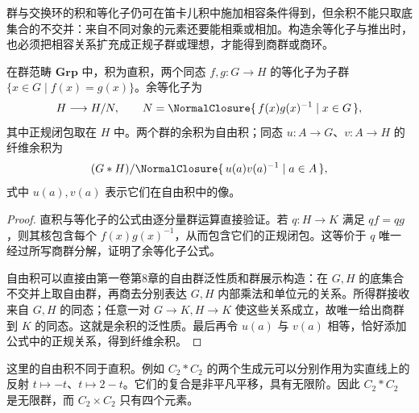群与交换环的积和等化子仍可在笛卡儿积中施加相容条件得到，但余积不能只取底集合的不交并：来自不同对象的元素还要能相乘或相加。构造余等化子与推出时，也必须把相容关系扩充成正规子群或理想，才能得到商群或商环。

\begin{proposition}[群中的基本构造]\label{b4:prop:group-limits-colimits}
	在群范畴 \(\mathbf{Grp}\) 中，积为直积，两个同态 \(f,g:G\rightarrow H\) 的等化子为子群 \(\{x\in G\mid f(x)=g(x)\}\)。余等化子为
	\[
		H\longrightarrow H/N,\qquad N=\NormalClosure{\,f(x)g(x)^{-1}\mid x\in G\,},
	\]
	其中正规闭包取在 \(H\) 中。两个群的余积为自由积；同态 \(u:A\rightarrow G\)、\(v:A\rightarrow H\) 的纤维余积为
	\[
		(G*H)/\NormalClosure{\,u(a)v(a)^{-1}\mid a\in A\,},
	\]
	式中 \(u(a),v(a)\) 表示它们在自由积中的像。
\end{proposition}
\begin{proof}
	直积与等化子的公式由逐分量群运算直接验证。若 \(q:H\rightarrow K\) 满足 \(qf=qg\)，则其核包含每个 \(f(x)g(x)^{-1}\)，从而包含它们的正规闭包。这等价于 \(q\) 唯一经过所写商群分解，证明了余等化子公式。

	自由积可以直接由第一卷第8章的自由群泛性质和群展示构造：在 \(G,H\) 的底集合不交并上取自由群，再商去分别表达 \(G,H\) 内部乘法和单位元的关系。所得群接收来自 \(G,H\) 的同态；任意一对 \(G\rightarrow K,H\rightarrow K\) 使这些关系成立，故唯一给出商群到 \(K\) 的同态。这就是余积的泛性质。最后再令 \(u(a)\) 与 \(v(a)\) 相等，恰好添加公式中的正规关系，得到纤维余积。
\end{proof}

这里的自由积不同于直积。例如 \(C_2*C_2\) 的两个生成元可以分别作用为实直线上的反射 \(t\mapsto-t\)、\(t\mapsto2-t\)。它们的复合是非平凡平移，具有无限阶。因此 \(C_2*C_2\) 是无限群，而 \(C_2\times C_2\) 只有四个元素。

